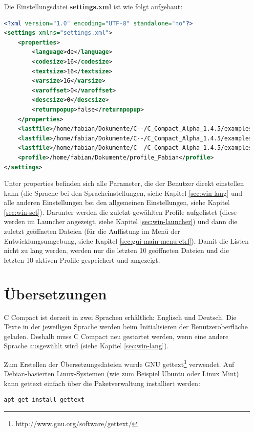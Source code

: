 Die Einstellungsdatei \textbf{settings.xml} ist wie folgt aufgebaut:
\begin{lstlisting}[language=XML]
<?xml version="1.0" encoding="UTF-8" standalone="no"?>
<settings xmlns="settings.xml">
	<properties>
		<language>de</language>
		<codesize>16</codesize>
		<textsize>16</textsize>
		<varsize>16</varsize>
		<varoffset>0</varoffset>
		<descsize>0</descsize>
		<returnpopup>false</returnpopup>
	</properties>
	<lastfile>/home/fabian/Dokumente/C--/C_Compact_Alpha_1.4.5/examples/helloworld/helloworld.cmm</lastfile>
	<lastfile>/home/fabian/Dokumente/C--/C_Compact_Alpha_1.4.5/examples/random/random.cmm</lastfile>
	<lastfile>/home/fabian/Dokumente/C--/C_Compact_Alpha_1.4.5/examples/bubblesort/bubblesort.cmm</lastfile>
	<profile>/home/fabian/Dokumente/profile_Fabian</profile>
</settings>
\end{lstlisting}

Unter \glqq{}properties\grqq{} befinden sich alle Parameter, die der Benutzer direkt einstellen kann (die Sprache bei den Spracheinstellungen, siehe Kapitel \ref{sec:win-lang} und alle anderen Einstellungen bei den allgemeinen Einstellungen, siehe Kapitel \ref{sec:win-set}). Darunter werden die zuletzt gewählten Profile aufgelistet (diese werden im Launcher angezeigt, siehe Kapitel \ref{sec:win-launcher}) und dann die zuletzt geöffneten Dateien (für die Auflistung im Menü der Entwicklungsumgebung, siehe Kapitel \ref{sec:gui-main-menu-ctrl}). Damit die Listen nicht zu lang werden, werden nur die letzten 10 geöffneten Dateien und die letzten 10 aktiven Profile gespeichert und angezeigt.

\section{Übersetzungen}
\label{sec:lang}
C Compact ist derzeit in zwei Sprachen erhältlich: Englisch und Deutsch. Die Texte in der jeweiligen Sprache werden beim Initialisieren der Benutzeroberfläche geladen. Deshalb muss C Compact neu gestartet werden, wenn eine andere Sprache ausgewählt wird (siehe Kapitel \ref{sec:win-lang}).

Zum Erstellen der Übersetzungsdateien wurde GNU gettext\footnote{http://www.gnu.org/software/gettext/} verwendet. Auf Debian-basierten Linux-Systemen (wie zum Beispiel Ubuntu oder Linux Mint) kann gettext einfach über die Paketverwaltung installiert werden:
\begin{lstlisting}[language=sh]
apt-get install gettext
\end{lstlisting}

